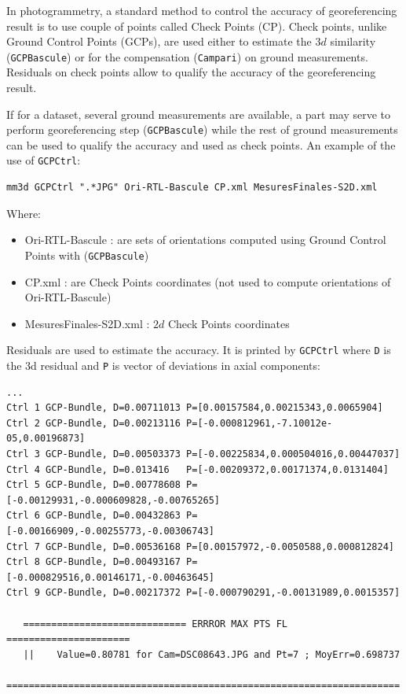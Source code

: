 In photogrammetry, a standard method to control the accuracy of georeferencing result is to use couple of points called Check Points (CP). 
Check points, unlike Ground Control Points (GCPs), are used either to estimate the $3d$ similarity ({\tt GCPBascule}) or for the compensation ({\tt Campari}) on ground measurements. Residuals on check points allow to qualify the accuracy of the georeferencing result.


If for a dataset, several ground measurements are available, a part may serve to perform georeferencing step ({\tt GCPBascule}) while the rest of ground measurements can be used to qualify the accuracy and used as check points. An example of the use of {\tt GCPCtrl}:


\begin{verbatim}
mm3d GCPCtrl ".*JPG" Ori-RTL-Bascule CP.xml MesuresFinales-S2D.xml
\end{verbatim}


Where:


\begin{itemize}
\item Ori-RTL-Bascule : are sets of orientations computed using Ground Control Points with ({\tt GCPBascule})
\item CP.xml : are Check Points coordinates (not used to compute orientations of Ori-RTL-Bascule)
\item MesuresFinales-S2D.xml : $2d$ Check Points coordinates
\end{itemize}


Residuals are used to estimate the accuracy. It is printed by {\tt GCPCtrl} where {\tt D} is the 3d residual and {\tt P} is vector of deviations in axial components:


\begin{verbatim}
...
Ctrl 1 GCP-Bundle, D=0.00711013 P=[0.00157584,0.00215343,0.0065904]
Ctrl 2 GCP-Bundle, D=0.00213116 P=[-0.000812961,-7.10012e-05,0.00196873]
Ctrl 3 GCP-Bundle, D=0.00503373 P=[-0.00225834,0.000504016,0.00447037]
Ctrl 4 GCP-Bundle, D=0.013416   P=[-0.00209372,0.00171374,0.0131404]
Ctrl 5 GCP-Bundle, D=0.00778608 P=[-0.00129931,-0.000609828,-0.00765265]
Ctrl 6 GCP-Bundle, D=0.00432863 P=[-0.00166909,-0.00255773,-0.00306743]
Ctrl 7 GCP-Bundle, D=0.00536168 P=[0.00157972,-0.0050588,0.000812824]
Ctrl 8 GCP-Bundle, D=0.00493167 P=[-0.000829516,0.00146171,-0.00463645]
Ctrl 9 GCP-Bundle, D=0.00217372 P=[-0.000790291,-0.00131989,0.0015357]

   ============================= ERRROR MAX PTS FL ======================
   ||    Value=0.80781 for Cam=DSC08643.JPG and Pt=7 ; MoyErr=0.698737
   ======================================================================

\end{verbatim}

